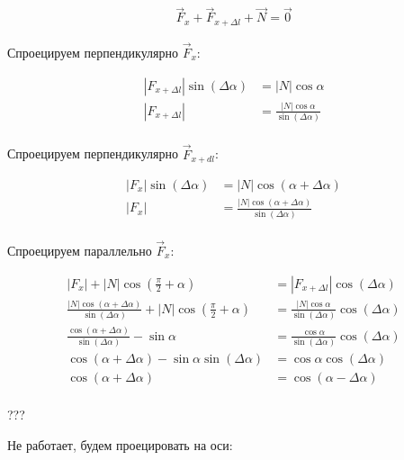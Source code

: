 \begin{align*}
    \vec F_x + \vec F_{x+\Delta l} + \vec N = \vec 0
\end{align*}

Спроецируем перпендикулярно $\vec F_{x}$:

\begin{align*}
    |F_{x+\Delta l}| \sin (\Delta\alpha) & = |N| \cos\alpha                             \\
    |F_{x+\Delta l}|                     & = \frac{|N| \cos\alpha}{\sin (\Delta\alpha)} \\
\end{align*}

Спроецируем перпендикулярно $\vec F_{x+dl}$:

\begin{align*}
    |F_{x}| \sin (\Delta\alpha) & = |N| \cos(\alpha + \Delta\alpha)                             \\
    |F_{x}|                     & = \frac{|N| \cos(\alpha + \Delta\alpha)}{\sin (\Delta\alpha)} \\
\end{align*}

Спроецируем параллельно $\vec F_x$:

\begin{align*}
    |F_x| + |N|\cos\left(\frac{\pi}{2} + \alpha\right)                                                       & = |F_{x+\Delta l}|\cos(\Delta\alpha)                           \\
    \frac{|N| \cos(\alpha + \Delta\alpha)}{\sin (\Delta\alpha)} + |N|\cos\left(\frac{\pi}{2} + \alpha\right) & = \frac{|N| \cos\alpha}{\sin (\Delta\alpha)}\cos(\Delta\alpha) \\
    \frac{\cos(\alpha + \Delta\alpha)}{\sin (\Delta\alpha)} -\sin\alpha                                      & = \frac{\cos\alpha}{\sin (\Delta\alpha)}\cos(\Delta\alpha)     \\
    \cos(\alpha + \Delta\alpha) -\sin\alpha\sin (\Delta\alpha)                                               & = \cos\alpha\cos(\Delta\alpha)                                 \\
    \cos(\alpha + \Delta\alpha)                                                                              & = \cos(\alpha - \Delta\alpha)                                  \\
\end{align*}

???

Не работает, будем проецировать на оси:

